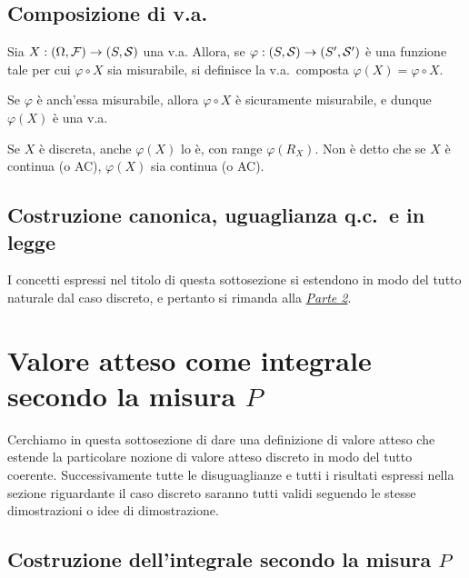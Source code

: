 \begin{multicols*}{2}
\subsection{Composizione di v.a.}

\begin{definition}
    Sia $X : (\Omega, \mathcal{F}) \to (S, \mathcal{S})$ una v.a. Allora, se
    $\varphi : (S, \mathcal{S}) \to (S', \mathcal{S}')$ è una funzione tale per cui
    $\varphi \circ X$ sia misurabile,
    si definisce la v.a.~composta $\varphi(X) = \varphi \circ X$. 
\end{definition}

\begin{remark}
    Se $\varphi$ è anch'essa misurabile, allora $\varphi \circ X$ è
    sicuramente misurabile, e dunque $\varphi(X)$ è una v.a.
\end{remark}

\begin{remark}
    Se $X$ è discreta, anche $\varphi(X)$ lo è, con range
    $\varphi(R_X)$. Non è detto che se $X$ è continua (o AC),
    $\varphi(X)$ sia continua (o AC).
\end{remark}

\subsection{Costruzione canonica, uguaglianza q.c.~e in legge}

I concetti espressi nel titolo di questa sottosezione si estendono
in modo del tutto naturale dal caso discreto, e pertanto si rimanda
alla \textit{\hyperref[sec:uguaglianza_qc]{Parte 2}}.

\section{Valore atteso come integrale secondo la misura \texorpdfstring{$P$}{P}}

Cerchiamo in questa sottosezione di dare una definizione di valore
atteso che estende la particolare nozione di valore atteso discreto
in modo del tutto coerente. Successivamente tutte le disuguaglianze
e tutti i risultati espressi nella sezione riguardante il caso
discreto saranno tutti validi seguendo le stesse dimostrazioni o
idee di dimostrazione.

\subsection{Costruzione dell'integrale secondo la misura \texorpdfstring{$P$}{P}}


\end{multicols*}
